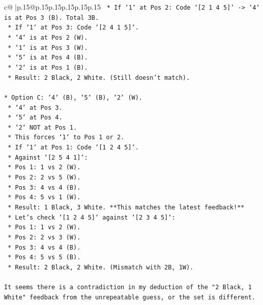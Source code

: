 \documentclass{article}
\begin{document}
{\begin{supertabular}{c@{$\;$}|p{.15\linewidth}@{}p{.15\linewidth}p{.15\linewidth}p{.15\linewidth}p{.15\linewidth}p{.15\linewidth}}
{{{\texttt{    *   If `1` at Pos 2: Code `{[}2 1 4 5{]}` {-}> `4` is at Pos 3 (B). Total 3B.} \\
\texttt{    *   If `1` at Pos 3: Code `{[}2 4 1 5{]}`.} \\
\texttt{        *   `4` is at Pos 2 (W).} \\
\texttt{        *   `1` is at Pos 3 (W).} \\
\texttt{        *   `5` is at Pos 4 (B).} \\
\texttt{        *   `2` is at Pos 1 (B).} \\
\texttt{        *   Result: 2 Black, 2 White. (Still doesn't match).} \\
\\ 
\texttt{*   Option C: `4` (B), `5` (B), `2` (W).} \\
\texttt{    *   `4` at Pos 3.} \\
\texttt{    *   `5` at Pos 4.} \\
\texttt{    *   `2` NOT at Pos 1.} \\
\texttt{    *   This forces `1` to Pos 1 or 2.} \\
\texttt{    *   If `1` at Pos 1: Code `{[}1 2 4 5{]}`.} \\
\texttt{        *   Against `{[}2 5 4 1{]}`:} \\
\texttt{            *   Pos 1: 1 vs 2 (W).} \\
\texttt{            *   Pos 2: 2 vs 5 (W).} \\
\texttt{            *   Pos 3: 4 vs 4 (B).} \\
\texttt{            *   Pos 4: 5 vs 1 (W).} \\
\texttt{            *   Result: 1 Black, 3 White. **This matches the latest feedback!**} \\
\texttt{        *   Let's check `{[}1 2 4 5{]}` against `{[}2 3 4 5{]}`:} \\
\texttt{            *   Pos 1: 1 vs 2 (W).} \\
\texttt{            *   Pos 2: 2 vs 3 (W).} \\
\texttt{            *   Pos 3: 4 vs 4 (B).} \\
\texttt{            *   Pos 4: 5 vs 5 (B).} \\
\texttt{            *   Result: 2 Black, 2 White. (Mismatch with 2B, 1W).} \\
\\ 
\texttt{It seems there is a contradiction in my deduction of the "2 Black, 1 White" feedback from the unrepeatable guess, or the set is different.} \\
}}}
\end{supertabular}}
\end{document}

